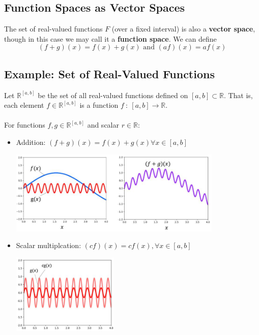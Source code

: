 \documentclass[10pt]{article}
\begin{document}
\subsection*{Function Spaces as Vector Spaces}
The set of real-valued functions $F$ (over a fixed interval) is also a \textbf{vector space}, though in this case we may call it a \textbf{function space}.  We can define
\[(f + g)(x) = f(x) + g(x) \text{ and } (af)(x) = af(x)\]

\subsection*{Example: Set of Real-Valued Functions}
Let $\mathbb{R}^{[a, b]}$ be the set of all real-valued functions defined on $[a, b] \subset \mathbb{R}$.  That is, each element $f \in \mathbb{R}^[a, b]$ is a function $f \::\: [a, b] \rightarrow \mathbb{R}$.\\\\
For functions $f, g \in \mathbb{R}^{[a, b]}$ and scalar $r \in \mathbb{R}$:
\begin{itemize}
	\item Addition: $(f + g)(x) = f(x) + g(x) \forall x \in [a, b]$
	\begin{center} 
	    \includegraphics*[width=0.8\textwidth]{M8_4.png} 
    \end{center}
    \item Scalar multiplcation: $(cf)(x) = cf(x), \forall x \in [a, b]$
    \begin{center} 
        \includegraphics*[width=0.4\textwidth]{M8_5.png} 
    \end{center}
\end{itemize}
\end{document}
